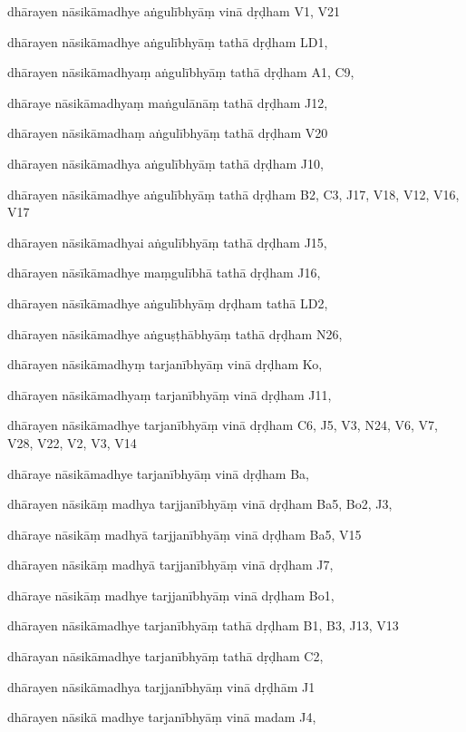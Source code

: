 \begin{ekdosis}
\begin{marma}[hp01_055]
\begin{marma}[hp02_009]
\begin{marma}[hp02_011]
\begin{marma}[hp02_62b]
\begin{description}
        \end{description}
\end{marma}

\begin{marma}[hp02_65cd]
\item[dhārayen nāsikāmadhye aṅgulībhyāṃ vinā dṛḍham] V1, V21
\item[dhārayen nāsikāmadhye aṅgulībhyāṃ tathā dṛḍham] LD1,
\item[dhārayen nāsikāmadhyaṃ aṅgulībhyāṃ tathā dṛḍham] A1, C9, 
\item[dhāraye nāsikāmadhyaṃ maṅgulānāṃ tathā dṛḍham] J12,
\item[dhārayen nāsikāmadhaṃ aṅgulībhyāṃ tathā dṛḍham] V20
\item[dhārayen nāsikāmadhya aṅgulībhyāṃ tathā dṛḍham] J10,
\item[dhārayen nāsikāmadhye aṅgulībhyāṃ tathā dṛḍham] B2, C3, J17, V18, V12, V16, V17
\item[dhārayen nāsikāmadhyai aṅgulībhyāṃ tathā dṛḍham] J15,
\item[dhārayen nāsīkāmadhye maṃgulībhā tathā dṛḍham] J16,
\item[dhārayen nāsīkāmadhye aṅgulībhyāṃ dṛḍham tathā] LD2,
\item[dhārayen nāsikāmadhye aṅguṣṭhābhyāṃ tathā dṛḍham] N26,
\item[dhārayen nāsikāmadhyṃ tarjanībhyāṃ vinā dṛḍham] Ko,
\item[dhārayen nāsikāmadhyaṃ tarjanībhyāṃ vinā dṛḍham] J11,
\item[dhārayen nāsikāmadhye tarjanībhyāṃ vinā dṛḍham] C6, J5, V3, N24, V6, V7, V28, V22, V2, V3, V14
\item[dhāraye nāsikāmadhye tarjanībhyāṃ vinā dṛḍham] Ba,
\item[dhārayen nāsikāṃ madhya tarjjanībhyāṃ vinā dṛḍham] Ba5, Bo2, J3,
\item[dhāraye nāsikāṃ madhyā tarjjanībhyāṃ vinā dṛḍham] Ba5, V15
\item[dhārayen nāsikāṃ madhyā tarjjanībhyāṃ vinā dṛḍham] J7,
\item[dhāraye nāsikāṃ madhye tarjjanībhyāṃ vinā dṛḍham] Bo1,
\item[dhārayen nāsikāmadhye tarjanībhyāṃ tathā dṛḍham] B1, B3, J13, V13
\item[dhārayan nāsikāmadhye tarjanībhyāṃ tathā dṛḍham] C2, 
\item[dhārayen nāsikāmadhya tarjjanībhyāṃ vinā dṛḍhām] J1
\item[dhārayen nāsikā madhye tarjanībhyāṃ vinā madam] J4,

\end{marma}
\end{marma}
\end{marma}
\end{marma}
\end{ekdosis}
